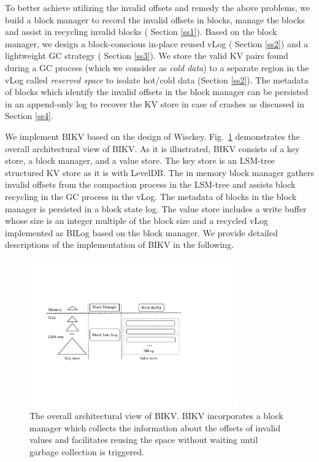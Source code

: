 \documentclass[sigconf]{acmart}
\begin{document}
To better achieve utilizing the invalid offsets and remedy the above problems, we build a block manager to record the invalid offsets in blocks, manage the blocks and assist in recycling invalid blocks ( Section \ref{ss1}). Based on the block manager, we design a block-conscious in-place reused vLog ( Section \ref{ss2}) and a lightweight GC strategy ( Section \ref{ss3}). We store the valid KV pairs found during a GC process (which we consider as \textit{cold data}) to a separate region in the vLog called \textit{reserved space} to isolate hot/cold data (Section \ref{ss2}). The metadata of blocks which identify the invalid offsets in the block manager can be persisted in an append-only log to recover the KV store in case of crashes as discussed in Section \ref{ss4}. 

We implement BIKV based on  the design of Wisckey. Fig.~\ref{fig:bikv} demonstrates the overall architectural view of BIKV.  As it is illustrated, BIKV consists of a key store, a block manager, and a value store. The key store is an LSM-tree structured KV store as it is with LevelDB. The in memory block manager gathers invalid offsets from the compaction process in the LSM-tree and assists block recycling in the GC process in the vLog. The metadata of blocks in the block manager is persisted in a block state log. The value store includes a write buffer whose size is an integer multiple of the block size and a recycled vLog implemented as BILog based on the block manager. We provide detailed descriptions of the implementation of BIKV in the following.


\begin{figure}[!t]
	\setlength{\abovecaptionskip}{0.cm}	
	\setlength{\belowcaptionskip}{-0.cm}
	\centerline{\includegraphics[width=90mm]{bikv.pdf}}
	\caption{The overall architectural view of BIKV. BIKV incorporates a block manager which collects the information about the offsets of invalid values and facilitates reusing the space without waiting until garbage collection is triggered. }
	\label{fig:bikv}
\end{figure}
\end{document}
